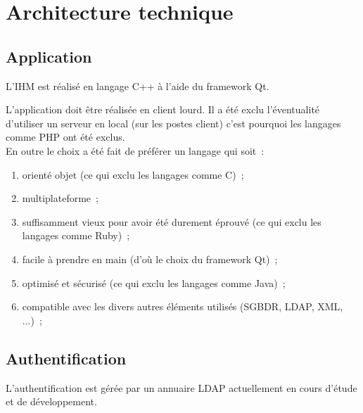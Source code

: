 \chapter{Architecture technique}

% 

\section{Application}
L'IHM est réalisé en langage C++ à l'aide du framework Qt.
\begin{notation}
L'application doit être réalisée en client lourd. Il a été exclu l'éventualité d'utiliser un serveur en local (sur les postes client) c'est pourquoi les langages comme PHP ont été exclus. \\
En outre le choix a été fait de préférer un langage qui soit~:
\begin{enumerate}
	\item orienté objet (ce qui exclu les langages comme C)~;
	\item multiplateforme~;
	\item suffisamment vieux pour avoir été durement éprouvé (ce qui exclu les langages comme Ruby)~;
	\item facile à prendre en main (d'où le choix du framework Qt)~;
	\item optimisé et sécurisé (ce qui exclu les langages comme Java)~;
	\item compatible avec les divers autres éléments utilisés (SGBDR, LDAP, XML, ...)~;
\end{enumerate}
\end{notation}

\section{Authentification}
L'authentification est gérée par un annuaire LDAP actuellement en cours d'étude et de développement.

\clearpage


\clearpage


\clearpage


\clearpage
